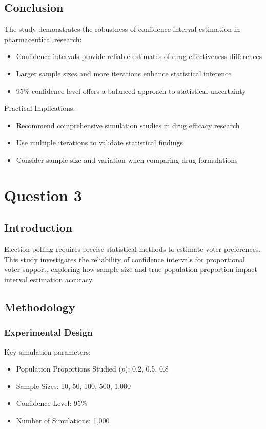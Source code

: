 \documentclass[12pt]{article}
\begin{document}
\subsection{Conclusion}
The study demonstrates the robustness of confidence interval estimation in pharmaceutical research:

\begin{itemize}
    \item Confidence intervals provide reliable estimates of drug effectiveness differences
    \item Larger sample sizes and more iterations enhance statistical inference
    \item 95\% confidence level offers a balanced approach to statistical uncertainty
\end{itemize}

Practical Implications:
\begin{itemize}
    \item Recommend comprehensive simulation studies in drug efficacy research
    \item Use multiple iterations to validate statistical findings
    \item Consider sample size and variation when comparing drug formulations
\end{itemize}

\section{Question 3}

\subsection{Introduction}
Election polling requires precise statistical methods to estimate voter preferences. This study investigates the reliability of confidence intervals for proportional voter support, exploring how sample size and true population proportion impact interval estimation accuracy.

\subsection{Methodology}
\subsubsection{Experimental Design}
Key simulation parameters:
\begin{itemize}
    \item Population Proportions Studied ($p$): 0.2, 0.5, 0.8
    \item Sample Sizes: 10, 50, 100, 500, 1,000
    \item Confidence Level: 95\%
    \item Number of Simulations: 1,000
\end{itemize}
\end{document}
